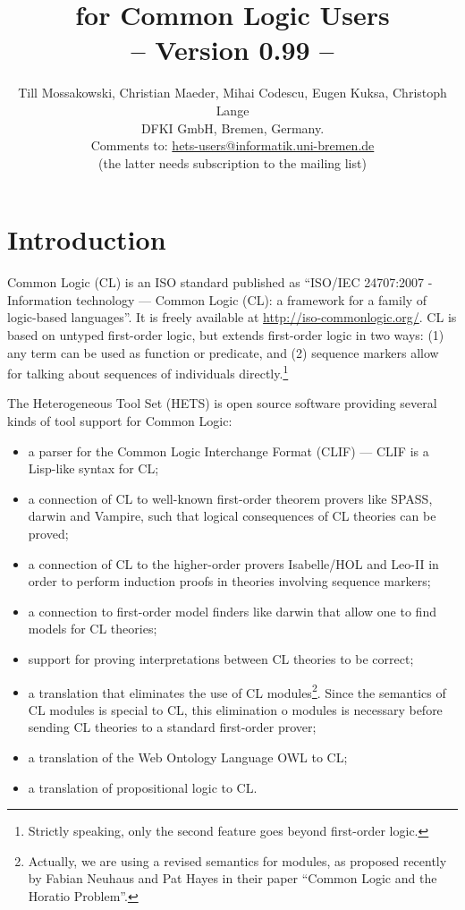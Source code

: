 \documentclass{article}
\newcommand{\normalTEXTSC}[2]{{#1\scriptsize#2}}
\newcommand{\LARGETEXTSC} [2]{{\LARGE     #1\large     #2}}
\newcommand     {\Hets}{\normalTEXTSC{H}{ETS}\xspace}
\newcommand{\LARGEHets} {\LARGETEXTSC{H}{ETS}\xspace}
\begin{document}
\title{{\bf \protect{\LARGEHets} for Common Logic Users}\\
-- Version 0.99 --}
\author{Till Mossakowski, Christian Maeder,
  Mihai Codescu, Eugen Kuksa, Christoph Lange\\[1em]
DFKI GmbH, Bremen, Germany.\\[1em]
Comments to: \href{mailto:hets-users@informatik.uni-bremen.de}{hets-users@informatik.uni-bremen.de} \\
(the latter needs subscription to the mailing list)
}

\maketitle

\section{Introduction}

Common Logic (CL) is an ISO standard published as ``ISO/IEC 24707:2007
- Information technology — Common Logic (CL): a framework for a family
of logic-based languages''. It is freely available at
\url{http://iso-commonlogic.org/}. CL is based on untyped first-order
logic, but extends first-order logic in two ways: (1) any term can be
used as function or predicate, and (2) sequence markers allow
for talking about sequences of individuals directly.\footnote
{Strictly speaking, only the second feature goes beyond first-order
logic.}

The Heterogeneous Tool Set (\Hets) is open source software providing
several kinds of tool support for Common Logic:
\begin{itemize}
\item a parser for the Common Logic Interchange Format (CLIF) --- CLIF
  is a Lisp-like syntax for CL;
\item a connection of CL to well-known first-order theorem provers
like SPASS, darwin and Vampire, such that logical consequences
of CL theories can be proved;
\item a connection of CL to the higher-order provers Isabelle/HOL
and Leo-II in order to perform induction proofs in theories
involving sequence markers;
\item a connection to first-order model finders like darwin that
allow one to find models for CL theories;
\item support for proving interpretations between CL theories to be correct;
\item a translation that eliminates the use of CL modules\footnote
{Actually, we are using a revised semantics for modules, as proposed
recently by Fabian Neuhaus and Pat Hayes in their paper ``Common Logic and
the Horatio Problem''.}. Since the semantics of CL modules
is special to CL, this elimination o modules is necessary before
sending CL theories to a standard first-order prover;
\item a translation of the Web Ontology Language OWL to CL;
\item a translation of propositional logic to CL.
\end{itemize}
\end{document}
